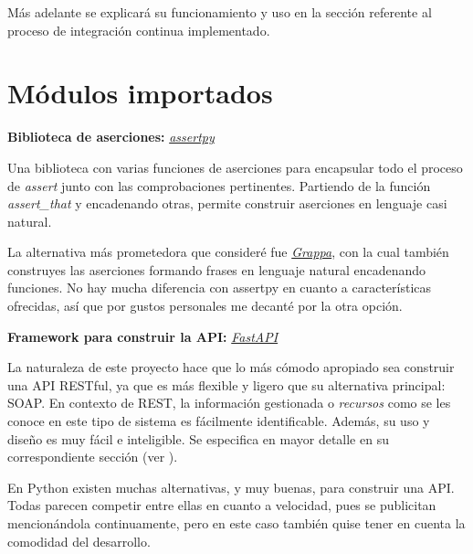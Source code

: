 Más adelante se explicará su funcionamiento y uso en la sección referente al proceso de integración continua implementado.


\section{Módulos importados}

\textbf{Biblioteca de aserciones:} \href{https://github.com/assertpy/assertpy}{\textit{assertpy}}

Una biblioteca con varias funciones de aserciones para encapsular todo el proceso de \textit{assert} junto con las comprobaciones pertinentes. Partiendo de la función \textit{assert\_that} y encadenando otras, permite construir aserciones en lenguaje casi natural.

La alternativa más prometedora que consideré fue \href{https://github.com/grappa-py/grappa}{\textit{Grappa}}, con la cual también construyes las aserciones formando frases en lenguaje natural encadenando funciones. No hay mucha diferencia con assertpy en cuanto a características ofrecidas, así que por gustos personales me decanté por la otra opción.

\textbf{Framework para construir la API:} \href{https://fastapi.tiangolo.com/}{\textit{FastAPI}}

La naturaleza de este proyecto hace que lo más cómodo apropiado sea construir una API RESTful, ya que es más flexible y ligero que su alternativa principal: SOAP. En contexto de REST, la información gestionada o \textit{recursos} como se les conoce en este tipo de sistema es fácilmente identificable. Además, su uso y diseño es muy fácil e inteligible. Se especifica en mayor detalle en su correspondiente sección (ver \underline{}).

En Python existen muchas alternativas, y muy buenas, para construir una API. Todas parecen competir entre ellas en cuanto a velocidad, pues se publicitan mencionándola continuamente, pero en este caso también quise tener en cuenta la comodidad del desarrollo.

